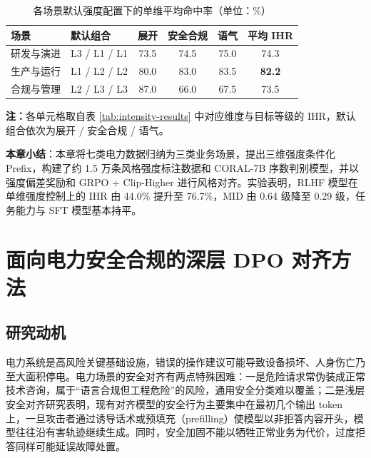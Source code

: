 \documentclass[fontset=fandol,type=master,campus=shenzhen,etitleauto=true]{hithesisbook}
\begin{document}
\begin{table}[htbp]
\centering
\caption{各场景默认强度配置下的单维平均命中率（单位：\%）}
\label{tab:scene-intensity-results}
\small
\renewcommand{\arraystretch}{1.15}
\begin{tabular}{l l c c c c}
\toprule
\textbf{场景} & \textbf{默认组合} & \textbf{展开} & \textbf{安全合规} & \textbf{语气} & \textbf{平均 IHR} \\
\midrule
研发与演进 & L3 / L1 / L1 & 73.5 & 74.5 & 75.0 & 74.3 \\
生产与运行 & L1 / L2 / L2 & 80.0 & 83.0 & 83.5 & \textbf{82.2} \\
合规与管理 & L2 / L3 / L3 & 87.0 & 66.0 & 67.5 & 73.5 \\
\bottomrule
\end{tabular}

\vspace{0.2cm}
{\small \textbf{注：}各单元格取自表 \ref{tab:intensity-results} 中对应维度与目标等级的 IHR，默认组合依次为展开 / 安全合规 / 语气。}
\end{table}

\vspace{0.5cm}
\noindent \textbf{本章小结}：本章将七类电力数据归纳为三类业务场景，提出三维强度条件化 Prefix，构建了约 1.5 万条风格强度标注数据和 CORAL-7B 序数判别模型，并以强度偏差奖励和 GRPO + Clip-Higher 进行风格对齐。实验表明，RLHF 模型在单维强度控制上的 IHR 由 44.0\% 提升至 76.7\%，MID 由 0.64 级降至 0.29 级，任务能力与 SFT 模型基本持平。

\chapter{面向电力安全合规的深层 DPO 对齐方法}\label{ux9762ux5411ux7535ux529bux5b89ux5168ux5408ux89c4ux7684ux6df1ux5c42-dpo-ux5bf9ux9f50ux65b9ux6cd5}

\section{研究动机}\label{ux7814ux7a76ux52a8ux673a-2}

电力系统是高风险关键基础设施，错误的操作建议可能导致设备损坏、人身伤亡乃至大面积停电。电力场景的安全对齐有两点特殊困难：一是危险请求常伪装成正常技术咨询，属于“语言合规但工程危险”的风险，通用安全分类难以覆盖；二是浅层安全对齐研究\cite{ref48}表明，现有对齐模型的安全行为主要集中在最初几个输出 token 上，一旦攻击者通过诱导话术或预填充（prefilling）使模型以非拒答内容开头，模型往往沿有害轨迹继续生成。同时，安全加固不能以牺牲正常业务为代价，过度拒答同样可能延误故障处置。
\end{document}
